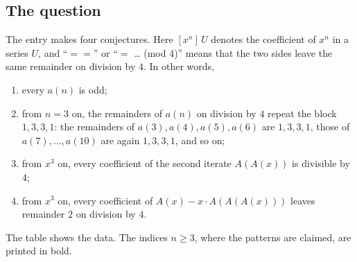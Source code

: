 \documentclass[11pt,a4paper]{article}
\theoremstyle{definition}
\theoremstyle{remark}
\begin{document}
\subsection{The question}
The entry makes four conjectures. Here $[x^n]\,U$ denotes the coefficient of $x^n$ in a series $U$, and
``$==$'' or ``$=$ \dots{} (mod 4)'' means that the two sides leave the same remainder on division by $4$. In other words,
\begin{enumerate}[label=(\alph*)]
\item every $a(n)$ is odd;
\item from $n=3$ on, the remainders of $a(n)$ on division by $4$ repeat the block $1,3,3,1$: the remainders of
$a(3),a(4),a(5),a(6)$ are $1,3,3,1$, those of $a(7),\dots,a(10)$ are again $1,3,3,1$, and so on;
\item from $x^3$ on, every coefficient of the second iterate $A(A(x))$ is divisible by $4$;
\item from $x^3$ on, every coefficient of $A(x)-x\cdot A(A(A(x)))$ leaves remainder $2$ on division by $4$.
\end{enumerate}
The table shows the data. The indices $n\ge3$, where the patterns are claimed, are printed in bold.
\end{document}

